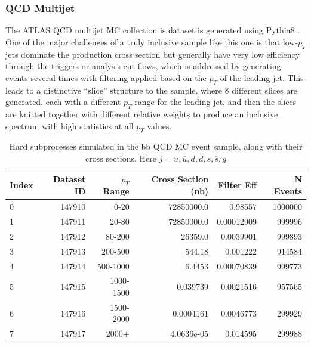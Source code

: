 \subsubsection{QCD Multijet}
The ATLAS QCD multijet MC collection is dataset is generated using Pythia8 \cite{Pythia8}.  
One of the major challenges of a truly inclusive sample like this one is that 
low-$p_T$ jets dominate the production cross section but generally have 
very low efficiency through the triggers or analysis cut flows, which is addressed by 
generating events several times with filtering applied based on the $p_T$ 
of the leading jet.  This leads to a distinctive ``slice'' structure to 
the sample, where 8 different slices are generated, each with a different $p_T$ 
range for the leading jet, and then the slices are knitted together with different 
relative weights to produce an inclusive spectrum with high statistics at all $p_T$ values.  

\begin{table}[h]
 \begin{center}
\caption{Hard subprocesses simulated in the bb QCD MC event sample, along with their cross sections. Here
$j=u,\bar{u},d,\bar{d},s,\bar{s},g$
\label{tab:qcd_mc_parameters}}
    \begin{tabular}{l r r r r r} \hline \hline
    Index & Dataset ID & $p_T$ Range& Cross Section (nb)& Filter Eff   & N Events \\ \hline
    0     &  147910    & 0-20        &  72850000.0       &      0.98557 & 1000000 \\
    1     &  147911    & 20-80       &  72850000.0       &   0.00012909 & 999996  \\
    2     &  147912    & 80-200      &     26359.0       &    0.0039901 & 999893 \\
    3     &  147913    & 200-500     &      544.18       &     0.001222 & 914584 \\
    4     &  147914    & 500-1000    &      6.4453       &   0.00070839 & 999773 \\
    5     &  147915    & 1000-1500   &    0.039739       &    0.0021516 & 957565 \\
    6     &  147916    & 1500-2000   &   0.0004161       &    0.0046773 & 299929 \\
    7     &  147917    & 2000+       &  4.0636e-05       &     0.014595 & 299988 \\
    \end{tabular}
  \end{center}
\end{table}

